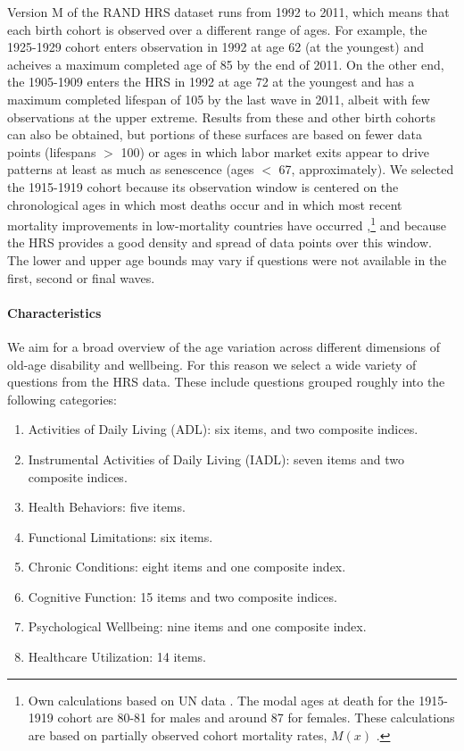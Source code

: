 \documentclass[11pt,oneside]{article} %
\begin{document}
Version M of the RAND HRS dataset runs from 1992 to 2011, which
means that each birth cohort is observed over a different range of ages. For
example, the 1925-1929 cohort enters observation in 1992 at age 62 (at the
youngest) and acheives a maximum completed age of 85 by the end of 2011. On the
other end, the 1905-1909 enters the HRS in 1992 at age 72 at the youngest and
has a maximum completed lifespan of 105 by the last wave in 2011, albeit with
few observations at the upper extreme. Results from these and other birth
cohorts can also be obtained, but portions of these surfaces are based on fewer
data points (lifespans $>$ 100) or ages in which labor market exits appear to drive patterns at least as much as senescence (ages $<$ 67, approximately). We selected the 1915-1919 cohort because
its observation window is centered on the chronological ages in which most
deaths occur and in which most recent mortality improvements in
low-mortality countries have occurred ,\footnote{Own calculations based on UN
data \citep{UN2012prospects}. The modal ages at death for the 1915-1919 cohort
are 80-81 for males and around 87 for females. These calculations are based on
partially observed cohort mortality rates, $M(x)$ \citep{HMD}.} and because the
HRS provides a good density and spread of data points over this window. The lower and upper age bounds may vary if questions were not available in the first, second or final waves.

\paragraph*{Characteristics}
We aim for a broad overview of the age variation across different dimensions of
old-age disability and wellbeing. For this reason we select a wide variety of
questions from the HRS data. These include questions
grouped roughly into the following categories: 

\begin{enumerate}
  \item Activities of Daily Living (ADL): six items, and two composite indices.
  \item Instrumental Activities of Daily Living (IADL): seven items and two
  composite indices.
  \item Health Behaviors: five items.
  \item Functional Limitations: six items.
  \item Chronic Conditions: eight items and one composite index.
  \item Cognitive Function: 15 items and two composite indices.
  \item Psychological Wellbeing: nine items and one composite index.
  \item Healthcare Utilization: 14 items.
\end{enumerate}
\end{document}
